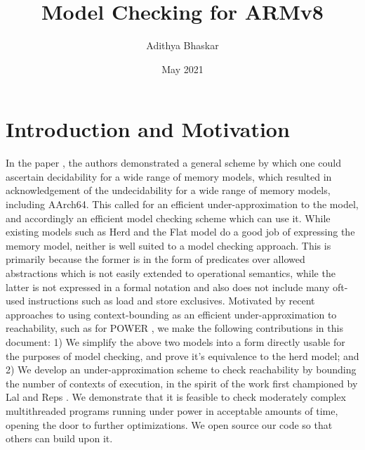 \documentclass{article}
\title{Model Checking for ARMv8}
\author{Adithya Bhaskar}
\date{May 2021}
\begin{document}
\maketitle
\section{Introduction and Motivation}
In the paper \cite{dec}, the authors demonstrated a general scheme by which one could ascertain decidability for a wide range of memory models, which resulted in acknowledgement of the undecidability for a wide range of memory models, including AArch64. This called for an efficient under-approximation to the model, and accordingly an efficient model checking scheme which can use it. While existing models such as Herd \cite{herd} and the Flat \cite{flat} model do a good job of expressing the memory model, neither is well suited to a model checking approach. This is primarily because the former is in the form of predicates over allowed abstractions which is not easily extended to operational semantics, while the latter is not expressed in a formal notation and also does not include many oft-used instructions such as load and store exclusives. Motivated by recent approaches to using context-bounding as an efficient under-approximation to reachability, such as for POWER \cite{power}, we make the following contributions in this document: 1) We simplify the above two models into a form directly usable for the purposes of model checking, and prove it's equivalence to the herd model; and 2) We develop an under-approximation scheme to check reachability by bounding the number of contexts of execution, in the spirit of the work first championed by Lal and Reps \cite{lalreps}. We demonstrate that it is feasible to check moderately complex multithreaded programs running under power in acceptable amounts of time, opening the door to further optimizations. We open source our code so that others can build upon it.
\end{document}

